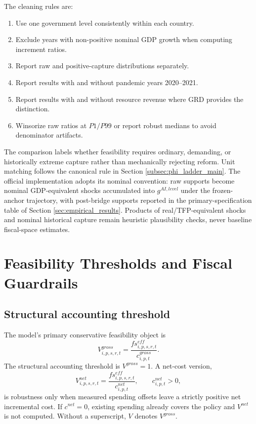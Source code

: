 \documentclass[11pt,a4paper]{article}
\begin{document}
The cleaning rules are:
\begin{enumerate}
    \item Use one government level consistently within each country.
    \item Exclude years with non-positive nominal GDP growth when computing increment ratios.
    \item Report raw and positive-capture distributions separately.
    \item Report results with and without pandemic years 2020--2021.
    \item Report results with and without resource revenue where GRD provides the distinction.
    \item Winsorize raw ratios at $P1/P99$ or report robust medians to avoid denominator artifacts.
\end{enumerate}
The comparison labels whether feasibility requires ordinary, demanding, or historically extreme capture rather than mechanically rejecting reform. Unit matching follows the canonical rule in Section \ref{subsec:phi_ladder_main}. The official implementation adopts its nominal convention: raw supports become nominal GDP-equivalent shocks accumulated into $g^{AI,level}$ under the frozen-anchor trajectory, with post-bridge supports reported in the primary-specification table of Section \ref{sec:empirical_results}. Products of real/TFP-equivalent shocks and nominal historical capture remain heuristic plausibility checks, never baseline fiscal-space estimates.


\section{Feasibility Thresholds and Fiscal Guardrails}\label{sec:thresholds}

\subsection{Structural accounting threshold}

The model's primary conservative feasibility object is
\begin{equation}\label{eq:Vgross_main_v10}
    V^{gross}_{i,p,s,r,t}=\frac{fs^{eff}_{i,p,s,r,t}}{c^{gross}_{i,p,t}}.
\end{equation}
The structural accounting threshold is $V^{gross}=1$. A net-cost version,
\begin{equation}\label{eq:Vnet_main_v10}
    V^{net}_{i,p,s,r,t}=\frac{fs^{eff}_{i,p,s,r,t}}{c^{net}_{i,p,t}},\qquad c^{net}_{i,p,t}>0,
\end{equation}
is robustness only when measured spending offsets leave a strictly positive net incremental cost. If $c^{net}=0$, existing spending already covers the policy and $V^{net}$ is not computed. Without a superscript, $V$ denotes $V^{gross}$.
\end{document}
